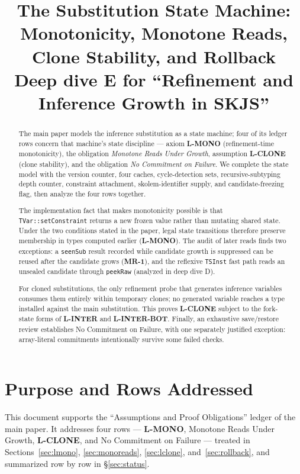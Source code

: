 \documentclass[11pt]{article}
\title{The Substitution State Machine: Monotonicity, Monotone Reads,
Clone Stability, and Rollback\\
{\large Deep dive E for ``Refinement and Inference Growth in SKJS''}}
\author{}
\date{\skjspin}
\begin{document}
\maketitle

\begin{abstract}
The main paper models the inference substitution as a state machine;
four of its ledger rows concern that machine's state discipline —
axiom \textbf{L-MONO} (refinement-time monotonicity), the
obligation \emph{Monotone Reads Under Growth}, assumption
\textbf{L-CLONE} (clone stability), and the obligation
\emph{No Commitment on Failure}. We complete the state model with the version
counter, four caches, cycle-detection sets, recursive-subtyping depth counter,
constraint attachment, skolem-identifier supply, and candidate-freezing flag,
then analyze the four rows together.

The implementation fact that makes monotonicity possible is that
\texttt{TVar::setConstraint} returns a new frozen value rather than mutating
shared state. Under the two conditions stated in the paper, legal state
transitions therefore preserve membership in types computed earlier
(\textbf{L-MONO}). The audit of later reads finds two exceptions: a
\texttt{seenSub} result recorded while candidate growth is suppressed can be
reused after the candidate grows (\textbf{MR-1}), and the reflexive
\texttt{TSInst} fast path reads an unsealed candidate through
\texttt{peekRaw} (analyzed in deep dive D).

For cloned substitutions, the only refinement probe that generates inference
variables consumes them entirely within temporary clones; no generated
variable reaches a type installed against the main substitution. This proves
\textbf{L-CLONE} subject to the fork-state forms of \textbf{L-INTER} and
\textbf{L-INTER-BOT}. Finally,
an exhaustive save/restore review establishes No Commitment on Failure, with
one separately justified exception: array-literal commitments intentionally
survive some failed checks.
\end{abstract}

\tableofcontents

\section{Purpose and Rows Addressed}
\label{sec:purpose}

This document supports the ``Assumptions and Proof Obligations'' ledger of
the main paper. It addresses four rows --- \textbf{L-MONO}, Monotone Reads
Under Growth, \textbf{L-CLONE}, and No Commitment on Failure --- treated in
Sections~\ref{sec:lmono}, \ref{sec:monoreads}, \ref{sec:lclone},
and~\ref{sec:rollback}, and summarized row by row in \S\ref{sec:status}.
\end{document}
